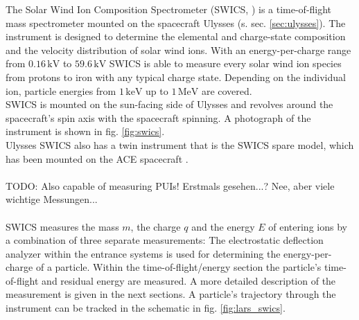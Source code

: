 The Solar Wind Ion Composition Spectrometer (SWICS, \citet{gloeckler_1992}) is a time-of-flight mass spectrometer mounted on the spacecraft Ulysses (s. sec. \ref{sec:ulysses}). The instrument is designed to determine the elemental and charge-state composition and the velocity distribution of solar wind ions. With an energy-per-charge range from $0.16 \, \mathrm{kV}$ to $59.6 \, \mathrm{kV}$ SWICS is able to measure every solar wind ion species from protons to iron with any typical charge state. Depending on the individual ion, particle energies from $1 \,\mathrm{keV}$ up to $1 \, \mathrm{MeV}$ are covered.\\
SWICS is mounted on the sun-facing side of Ulysses and revolves around the spacecraft's spin axis with the spacecraft spinning. A photograph of the instrument is shown in fig. \ref{fig:swics}.\\
Ulysses SWICS also has a twin instrument that is the SWICS spare model, which has been mounted on the ACE spacecraft \citep{stone_ace}.
\\ \\ 
TODO: Also capable of measuring PUIs! Erstmals gesehen...? Nee, aber viele wichtige Messungen... \\ \\
%
%
%
SWICS measures the mass $m$, the charge $q$ and the energy $E$ of entering ions by a combination of three separate measurements: The electrostatic deflection analyzer within the entrance systems is used for determining the energy-per-charge of a particle. Within the time-of-flight/energy section the particle's time-of-flight and residual energy are measured. A more detailed description of the measurement is given in the next sections. A particle's trajectory through the instrument can be tracked in the schematic in fig. \ref{fig:lars_swics}.
%
